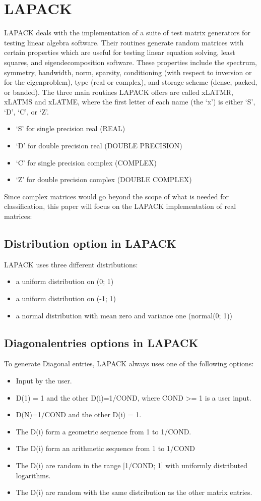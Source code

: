\documentclass[parskip=full]{scrartcl}
\begin{document}
\section{LAPACK}
LAPACK deals with the implementation of a suite of test matrix generators for testing linear algebra software. Their routines generate random matrices with certain properties which are useful for testing linear equation solving, least squares, and eigendecomposition software. These properties include the spectrum, symmetry, bandwidth, norm, sparsity, conditioning  (with respect to inversion or for the eigenproblem), type (real or complex), and storage scheme (dense, packed, or banded).
The three main routines LAPACK offers are called xLATMR, xLATMS and xLATME, where the first letter of each name (the `x') is either `S', `D', `C', or `Z'. 
\begin{itemize}
\item ‘S’ for single precision real (REAL)
\item ‘D’ for double precision real (DOUBLE PRECISION)
\item ‘C’ for single precision complex (COMPLEX)
\item ‘Z’ for double precision complex (DOUBLE COMPLEX)
\end{itemize}
Since complex matrices would go beyond the scope of what is needed for classification, this paper will focus on the LAPACK implementation of real matrices:

\newpage
\subsection{Distribution option in LAPACK}
LAPACK uses three different distributions:
\begin{itemize}
\item a uniform distribution on (0; 1)
\item a uniform distribution on (-1; 1)
\item a normal distribution with mean zero and variance one (normal(0; 1))
\end{itemize}

\subsection{Diagonalentries options in LAPACK}
To generate Diagonal entries, LAPACK always uses one of the following options:
\begin{itemize}
	\item Input by the user.
	\item D(1) = 1 and the other D(i)=1/COND, where COND >= 1 is a user input.
	\item D(N)=1/COND and the other D(i) = 1. 
	\item The D(i) form a geometric sequence from 1 to 1/COND. 
	\item The D(i) form an arithmetic sequence from 1 to 1/COND
	\item The D(i) are random in the range [1/COND; 1] with uniformly distributed logarithms. 
	\item The D(i) are random with the same distribution as the other matrix entries.
\end{itemize}
\end{document}
